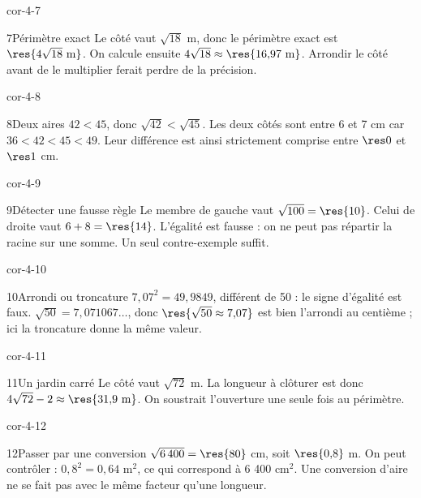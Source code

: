 \begin{blocLivre}{cor-4-7}\begin{corrige}{7}{Périmètre exact}
Le côté vaut $\sqrt{18}$ m, donc le périmètre exact est $\res{4\sqrt{18}\ \mathrm m}$. On calcule ensuite $4\sqrt{18}\approx\res{16{,}97\ \mathrm m}$. Arrondir le côté avant de le multiplier ferait perdre de la précision.
\label{fig-cor-4-7}
\end{corrige}\end{blocLivre}
\begin{blocLivre}{cor-4-8}\begin{corrige}{8}{Deux aires}
$42<45$, donc $\sqrt{42}<\sqrt{45}$. Les deux côtés sont entre 6 et 7 cm car $36<42<45<49$. Leur différence est ainsi strictement comprise entre $\res0$ et $\res1$ cm.
\end{corrige}\end{blocLivre}
\begin{blocLivre}{cor-4-9}\begin{corrige}{9}{Détecter une fausse règle}
Le membre de gauche vaut $\sqrt{100}=\res{10}$. Celui de droite vaut $6+8=\res{14}$. L’égalité est fausse : on ne peut pas répartir la racine sur une somme. Un seul contre-exemple suffit.
\end{corrige}\end{blocLivre}
\begin{blocLivre}{cor-4-10}\begin{corrige}{10}{Arrondi ou troncature}
$7{,}07^2=49{,}9849$, différent de 50 : le signe d’égalité est faux. $\sqrt{50}=7{,}071067\ldots$, donc $\res{\sqrt{50}\approx7{,}07}$ est bien l’arrondi au centième ; ici la troncature donne la même valeur.
\end{corrige}\end{blocLivre}
\begin{blocLivre}{cor-4-11}\begin{corrige}{11}{Un jardin carré}
Le côté vaut $\sqrt{72}$ m. La longueur à clôturer est donc $4\sqrt{72}-2\approx\res{31{,}9\ \mathrm m}$. On soustrait l’ouverture une seule fois au périmètre.
\label{fig-cor-4-11}
\end{corrige}\end{blocLivre}
\begin{blocLivre}{cor-4-12}\begin{corrige}{12}{Passer par une conversion}
$\sqrt{6\,400}=\res{80}$ cm, soit $\res{0{,}8}$ m. On peut contrôler : $0{,}8^2=0{,}64$ m$^2$, ce qui correspond à 6 400 cm$^2$. Une conversion d’aire ne se fait pas avec le même facteur qu’une longueur.
\end{corrige}\end{blocLivre}
